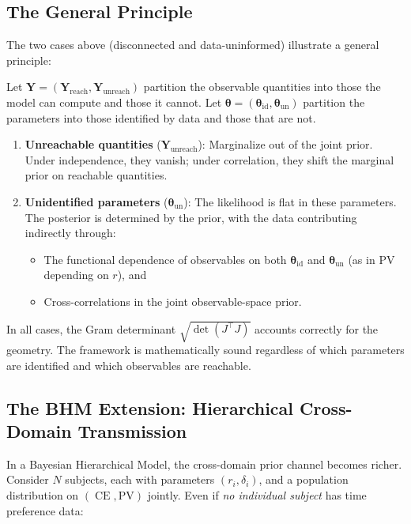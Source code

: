 \documentclass[11pt,a4paper]{article}
\theoremstyle{definition}
\newcommand{\btheta}{\boldsymbol{\theta}}
\DeclareMathOperator{\CE}{CE}
\begin{document}
\subsection{The General Principle}

The two cases above (disconnected and data-uninformed) illustrate a general
principle:

\begin{keyresult}
Let $\mathbf{Y} = (\mathbf{Y}_{\text{reach}}, \mathbf{Y}_{\text{unreach}})$
partition the observable quantities into those the model can compute and those
it cannot. Let $\btheta = (\btheta_{\text{id}}, \btheta_{\text{un}})$
partition the parameters into those identified by data and those that are not.
\begin{enumerate}
    \item \textbf{Unreachable quantities} ($\mathbf{Y}_{\text{unreach}}$):
    Marginalize out of the joint prior. Under independence, they vanish; under
    correlation, they shift the marginal prior on reachable quantities.

    \item \textbf{Unidentified parameters} ($\btheta_{\text{un}}$): The
    likelihood is flat in these parameters. The posterior is determined by
    the prior, with the data contributing indirectly through:
    \begin{itemize}
        \item The functional dependence of observables on both
        $\btheta_{\text{id}}$ and $\btheta_{\text{un}}$ (as in $\mathrm{PV}$
        depending on $r$), and
        \item Cross-correlations in the joint observable-space prior.
    \end{itemize}
\end{enumerate}
In all cases, the Gram determinant $\sqrt{\det(J^\top J)}$ accounts correctly
for the geometry. The framework is mathematically sound regardless of which
parameters are identified and which observables are reachable.
\end{keyresult}

\subsection{The BHM Extension: Hierarchical Cross-Domain Transmission}
\label{sec:bhm_cross}

In a Bayesian Hierarchical Model, the cross-domain prior channel becomes
richer. Consider $N$ subjects, each with parameters
$(r_i, \delta_i)$, and a population distribution on $(\CE, \mathrm{PV})$
jointly. Even if \emph{no individual subject} has time preference data:
\end{document}
